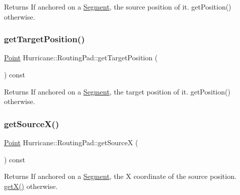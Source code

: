 \begin{DoxyReturn}{Returns}
If anchored on a \hyperlink{classHurricane_1_1Segment}{Segment}, the source position of it. get\+Position() otherwise. 
\end{DoxyReturn}
\mbox{\label{classHurricane_1_1RoutingPad_a8de215adabb4a3330d02339c38dd6d4b}} 
\subsubsection{\texorpdfstring{get\+Target\+Position()}{getTargetPosition()}}
{\footnotesize\ttfamily \hyperlink{classHurricane_1_1Point}{Point} Hurricane\+::\+Routing\+Pad\+::get\+Target\+Position (\begin{DoxyParamCaption}{ }\end{DoxyParamCaption}) const}

\begin{DoxyReturn}{Returns}
If anchored on a \hyperlink{classHurricane_1_1Segment}{Segment}, the target position of it. get\+Position() otherwise. 
\end{DoxyReturn}
\mbox{\label{classHurricane_1_1RoutingPad_ae80e8f84f5806582905f6695f5cc43df}} 
\subsubsection{\texorpdfstring{get\+Source\+X()}{getSourceX()}}
{\footnotesize\ttfamily \hyperlink{classHurricane_1_1Point}{Point} Hurricane\+::\+Routing\+Pad\+::get\+SourceX (\begin{DoxyParamCaption}{ }\end{DoxyParamCaption}) const}

\begin{DoxyReturn}{Returns}
If anchored on a \hyperlink{classHurricane_1_1Segment}{Segment}, the X coordinate of the source position. \hyperlink{classHurricane_1_1RoutingPad_a5c9c00c648bd0d24e1a8b0876ab442df}{get\+X()} otherwise. 
\end{DoxyReturn}
\mbox{\label{classHurricane_1_1RoutingPad_a75983ff3507f4cbf2aaa4e3132eac987}} 
